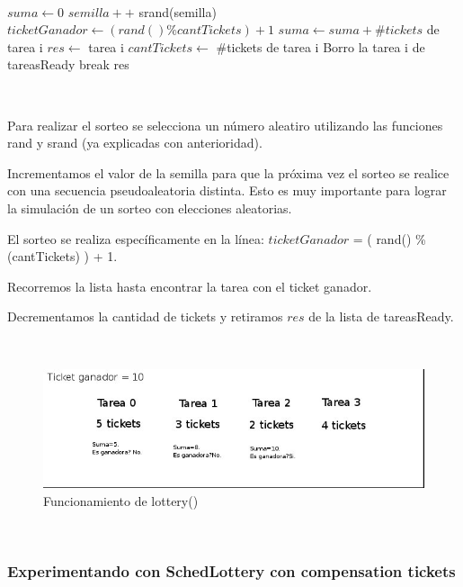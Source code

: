 ~

\begin{algorithmic}
	\State $suma \gets 0$
      	\State $semilla++$
	\State srand(semilla)
	\State $ticketGanador \gets (rand() \% cantTickets)+1$
		\State $suma \gets suma+ \#tickets$ de tarea i		
			\State $res \gets$ tarea i
			\State $cantTickets \gets $ \#tickets de tarea i	
			\State Borro la tarea i de tareasReady
			\State break
		\EndIf
	\EndFor	
	\State \Return res
  \EndFunction
\end{algorithmic}

~

Para realizar el sorteo se selecciona un número aleatiro utilizando las funciones rand y srand (ya explicadas con anterioridad).

Incrementamos el valor de la semilla para que la próxima vez el sorteo se realice con una secuencia pseudoaleatoria distinta. Esto es muy importante
para lograr la simulación de un sorteo con elecciones aleatorias.

El sorteo se realiza específicamente en la línea: $ticketGanador$ = ( rand() \% (cantTickets) ) + 1.

Recorremos la lista hasta encontrar la tarea con el ticket ganador.

Decrementamos la cantidad de tickets y retiramos $res$ de la lista de tareasReady.

~

\begin{figure}[H]
  \centering\includegraphics[scale=0.5]{graficos/lottery.jpg}
  \caption{Funcionamiento de lottery()}
\end{figure}

~

\subsubsection{Experimentando con SchedLottery con compensation tickets}

~

